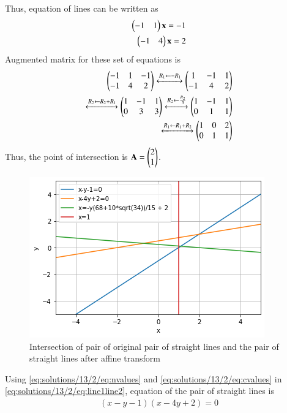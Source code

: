 Thus, equation of lines can be written as
\begin{align}
    \begin{pmatrix}-1 & 1\end{pmatrix}\mathbf{x} = -1\\
    \begin{pmatrix}-1 & 4\end{pmatrix}\mathbf{x} = 2
\end{align}
Augmented matrix for these set of equations is
\begin{align}
    \begin{pmatrix}-1 & 1 & -1 \\ -1 & 4 & 2\end{pmatrix}\xleftrightarrow{R_1\leftarrow -R_1}\begin{pmatrix}1 & -1 & 1 \\ -1 & 4 & 2\end{pmatrix}\\\xleftrightarrow{R_2\leftarrow R_2+R_1}\begin{pmatrix}1 & -1 & 1 \\ 0 & 3 & 3\end{pmatrix}
    \xleftrightarrow{R_2\leftarrow \frac{R_2}{3}}\begin{pmatrix}1 & -1 & 1 \\ 0 & 1 & 1\end{pmatrix}\\\xleftrightarrow{R_1\leftarrow R_1+R_2}\begin{pmatrix}1 & 0 & 2 \\ 0 & 1 & 1\end{pmatrix}
\end{align}
Thus, the point of intersection is $\mathbf{A} = \begin{pmatrix}2 \\ 1\end{pmatrix}$.
\begin{figure}[h!]
    \centering
    \includegraphics[width=\columnwidth]{./solutions/13/2/assignment3.png}
    \caption{Intersection of pair of original pair of straight lines and the pair of straight lines after affine transform}
    \label{eq:solutions/13/2/fig:fig1}
\end{figure}

Using \eqref{eq:solutions/13/2/eq:nvalues} and \eqref{eq:solutions/13/2/eq:cvalues} in \eqref{eq:solutions/13/2/eq:line1line2}, equation of the pair of straight lines is
\begin{align}
    (x-y-1)(x-4y+2) = 0
\end{align}

